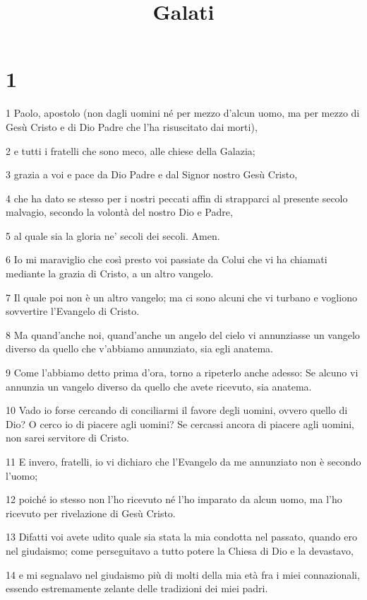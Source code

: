 

\title{Galati}


\chapter{1}

\par 1 Paolo, apostolo (non dagli uomini né per mezzo d'alcun uomo, ma per mezzo di Gesù Cristo e di Dio Padre che l'ha risuscitato dai morti),
\par 2 e tutti i fratelli che sono meco, alle chiese della Galazia;
\par 3 grazia a voi e pace da Dio Padre e dal Signor nostro Gesù Cristo,
\par 4 che ha dato se stesso per i nostri peccati affin di strapparci al presente secolo malvagio, secondo la volontà del nostro Dio e Padre,
\par 5 al quale sia la gloria ne' secoli dei secoli. Amen.
\par 6 Io mi maraviglio che così presto voi passiate da Colui che vi ha chiamati mediante la grazia di Cristo, a un altro vangelo.
\par 7 Il quale poi non è un altro vangelo; ma ci sono alcuni che vi turbano e vogliono sovvertire l'Evangelo di Cristo.
\par 8 Ma quand'anche noi, quand'anche un angelo del cielo vi annunziasse un vangelo diverso da quello che v'abbiamo annunziato, sia egli anatema.
\par 9 Come l'abbiamo detto prima d'ora, torno a ripeterlo anche adesso: Se alcuno vi annunzia un vangelo diverso da quello che avete ricevuto, sia anatema.
\par 10 Vado io forse cercando di conciliarmi il favore degli uomini, ovvero quello di Dio? O cerco io di piacere agli uomini? Se cercassi ancora di piacere agli uomini, non sarei servitore di Cristo.
\par 11 E invero, fratelli, io vi dichiaro che l'Evangelo da me annunziato non è secondo l'uomo;
\par 12 poiché io stesso non l'ho ricevuto né l'ho imparato da alcun uomo, ma l'ho ricevuto per rivelazione di Gesù Cristo.
\par 13 Difatti voi avete udito quale sia stata la mia condotta nel passato, quando ero nel giudaismo; come perseguitavo a tutto potere la Chiesa di Dio e la devastavo,
\par 14 e mi segnalavo nel giudaismo più di molti della mia età fra i miei connazionali, essendo estremamente zelante delle tradizioni dei miei padri.
